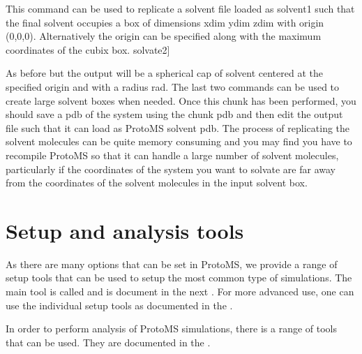 \documentclass[letterpaper,10pt,english]{sphinxmanual}
\begin{document}
This command can be used to replicate a solvent file loaded as solvent1 such that the final solvent occupies a box of dimensions xdim ydim zdim with origin (0,0,0). Alternatively the origin can be specified along with the maximum coordinates of the cubix box. solvate2{]}

%
\begin{sphinxVerbatim}[commandchars=\\\{\}]
      
\end{sphinxVerbatim}

As before but the output will be a spherical cap of solvent centered at the specified origin and with a radius rad. The last two commands can be used to create large solvent boxes when needed. Once this chunk has been performed, you should save a pdb of the system using the chunk pdb and then edit the output file such that it can load as ProtoMS solvent pdb. The process of replicating the solvent molecules can be quite memory consuming and you may find you have to recompile ProtoMS so that it can handle a large number of solvent molecules, particularly if the coordinates of the system you want to solvate are far away from the coordinates of the solvent molecules in the input solvent box.


\section{Setup and analysis tools}
\label{\detokenize{protoms:setup-and-analysis-tools}}
As there are many options that can be set in ProtoMS, we provide a range of setup tools that can be used to setup the most common type of simulations. The main tool is called  and is document in the next . For more advanced use, one can use the individual setup tools as documented in the .

In order to perform analysis of ProtoMS simulations, there is a range of tools that can be used. They are documented in the .
\end{document}

